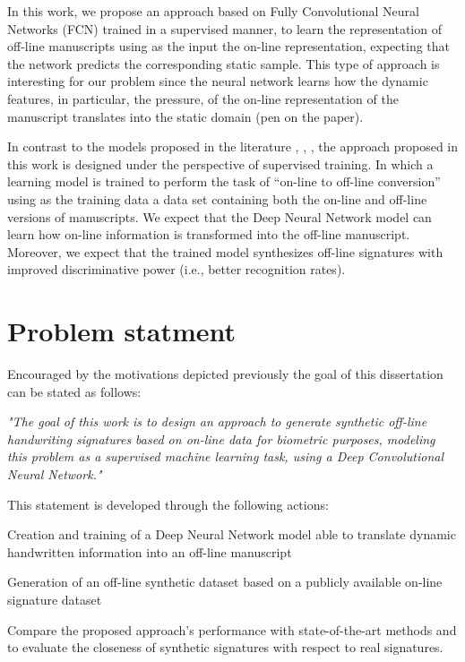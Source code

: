 In this work, we propose an approach based on Fully Convolutional Neural Networks (FCN) trained in a supervised manner, to learn the representation of off-line manuscripts using as the input the on-line representation, expecting that the network predicts the corresponding static sample. This type of approach is interesting for our problem since the neural network learns how the dynamic features, in particular, the pressure, of the on-line representation of the manuscript translates into the static domain (pen on the paper). 

In contrast to the models proposed in the literature \cite{ferrer2013synthetic}, \cite{ferrer2013realistic}, \cite{diaz2014generation}, the approach proposed in this work is designed under the perspective of supervised training. In which a learning model is trained to perform the task of ``on-line to off-line conversion'' using as the training data a data set containing both the on-line and off-line versions of manuscripts. We expect that the Deep Neural Network model can learn how on-line information is transformed into the off-line manuscript. Moreover, we expect that the trained model synthesizes off-line signatures with improved discriminative power (i.e., better recognition rates). 

\section{Problem statment}
Encouraged by the motivations depicted previously the goal of this dissertation can be stated as follows:

\textit{"The goal of this work is to design an approach to generate synthetic off-line handwriting signatures based on on-line data for biometric purposes, modeling this problem as a supervised machine learning task, using a Deep Convolutional Neural Network."}

This statement is developed through the following actions:
\begin{inlinelist}
\item Creation and training of a Deep Neural Network model able to translate dynamic handwritten information into an off-line manuscript
\item Generation of an off-line synthetic dataset based on a publicly available on-line signature dataset
\item Compare the proposed approach’s performance with state-of-the-art methods and to evaluate the closeness of synthetic signatures with respect to real signatures. 
\end{inlinelist}


